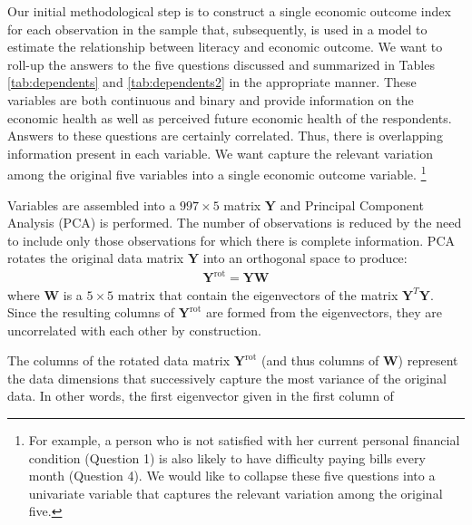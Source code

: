 \documentclass[12pt]{article}
\theoremstyle{plain}
\begin{document}
Our initial methodological step is to construct a single economic outcome index for each observation in the sample that, subsequently, is used in a model to estimate the relationship between literacy and economic outcome.  We want to roll-up the answers to the five questions discussed and summarized in Tables \ref{tab:dependents} and \ref{tab:dependents2} in the appropriate manner. These variables are both continuous and binary and provide information on the economic health as well as perceived future economic health of the respondents.  Answers to these questions are certainly correlated.  Thus, there is overlapping information present in each variable. We want capture the relevant variation among the original five variables into a single economic outcome variable. \footnote{For example, a person who is not satisfied with her current personal financial condition (Question 1) is also likely to have difficulty paying bills every month (Question 4).   We would like to collapse these five questions into a univariate variable that captures the relevant variation among the original five.} 

Variables are assembled into a $997 \times 5$ matrix $\textbf{Y}$ and Principal Component Analysis (PCA) is performed. The number of observations is reduced by the need to include only those observations for which there is complete information. PCA rotates the original data matrix $\textbf{Y}$ into an orthogonal space to produce:
\begin{equation}
	\begin{split}
		\textbf{Y}^{\text{rot}} = \textbf{Y}\textbf{W}
	\end{split}
\end{equation}where \textbf{W} is a $5 \times 5$ matrix that contain the eigenvectors of the matrix $\textbf{Y}^{T}\textbf{Y}$.  Since the resulting columns of $\textbf{Y}^{\text{rot}}$ are formed from the eigenvectors, they are uncorrelated with each other by construction.

The columns of the rotated data matrix $\textbf{Y}^{\text{rot}}$ (and thus columns of \textbf{W}) represent the data dimensions that successively capture the most variance of the original data.  In other words, the first eigenvector given in the first column of
\end{document}
